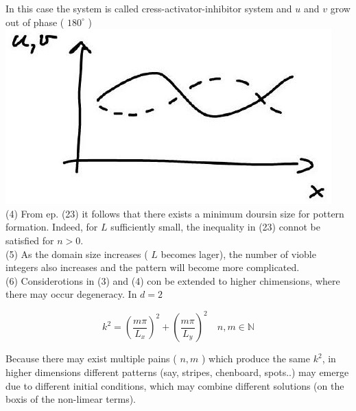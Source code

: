 \documentclass[10pt]{article}
\begin{document}
In this case the system is called cress-activator-inhibitor system and $u$ and $v$ grow out of phase ( $180^{\circ}$ )\\
\includegraphics[max width=\textwidth, center]{2025_10_17_3cf351a4349ae3691080g-13}\\
(4) From ep. (23) it follows that there exists a minimum doursin size for pottern formation. Indeed, for $L$ sufficiently small, the inequality in (23) connot be satisfied for $n>0$.\\
(5) As the domain size increases ( $L$ becomes lager), the number of vioble integers also increases and the pattern will become more complicated.\\
(6) Considerotions in (3) and (4) con be extended to higher chimensions, where there may occur degeneracy. In $d=2$

$$
k^{2}=\left(\frac{m \pi}{L_{x}}\right)^{2}+\left(\frac{m \pi}{L_{y}}\right)^{2} \quad n, m \in \mathbb{N}
$$

Because there may exist multiple pains ( $n, m$ ) which produce the same $k^{2}$, in higher dimensions different patterns (say, stripes, chenboard, spots..) may emerge due to different initial conditions, which may combine different solutions (on the boxis of the non-limear terms).
\end{document}
